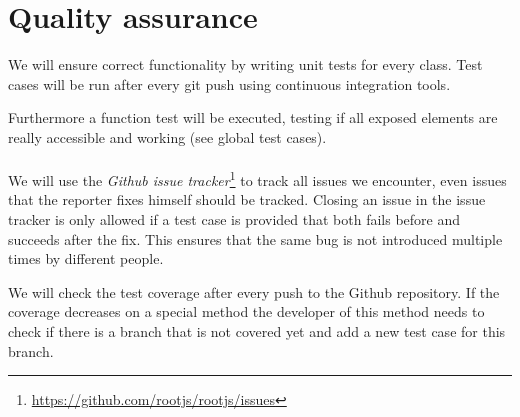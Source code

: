 \chapter{Quality assurance}
We will ensure correct functionality by writing unit tests for every class. Test cases will be run after every git push using continuous integration tools.

Furthermore a function test will be executed, testing if all exposed elements are really accessible and working (see global test cases).
\\\\

We will use the \textit{Github issue tracker}\footnote{\url{https://github.com/rootjs/rootjs/issues}} to track all issues we encounter, even issues that the reporter fixes himself should be tracked.
Closing an issue in the issue tracker is only allowed if a test case is provided that both fails before and succeeds after the fix. This ensures that the same bug is not introduced multiple times by different people.

We will check the test coverage after every push to the Github repository. If the coverage decreases on a special method the developer of this method needs to check if there is a branch that is not covered yet and add a new test case for this branch.
